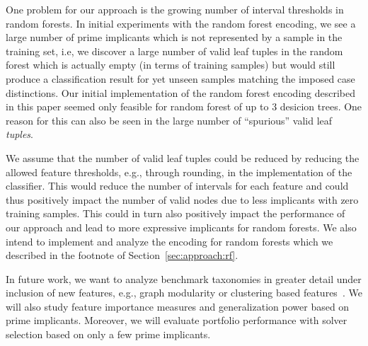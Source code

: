 \documentclass[a4paper, USenglish, cleveref, autoref, thm-restate]{lipics-v2021}
\theoremstyle{definition}
\begin{document}
One problem for our approach is the growing number of interval thresholds in random forests. 
In initial experiments with the random forest encoding, we see a large number of prime implicants which is not represented by a sample in the training set, i.e, we discover a large number of valid leaf tuples in the random forest which is actually empty (in terms of training samples) but would still produce a classification result for yet unseen samples matching the imposed case distinctions. 
Our initial implementation of the random forest encoding described in this paper seemed only feasible for random forest of up to 3 desicion trees. 
One reason for this can also be seen in the large number of ``spurious'' valid leaf \emph{tuples}. 

We assume that the number of valid leaf tuples could be reduced by reducing the allowed feature thresholds, e.g., through rounding, in the implementation of the classifier. 
This would reduce the number of intervals for each feature and could thus positively impact the number of valid nodes due to less implicants with zero training samples. 
This could in turn also positively impact the performance of our approach and lead to more expressive implicants for random forests. 
We also intend to implement and analyze the encoding for random forests which we described in the footnote of Section~\ref{sec:approach:rf}. 

In future work, we want to analyze benchmark taxonomies in greater detail under inclusion of new features, e.g., graph modularity or clustering based features~\cite{Ansotegui:2019:Community,Li:2021:Hierarchical}. 
We will also study feature importance measures and generalization power based on prime implicants. 
Moreover, we will evaluate portfolio performance with solver selection based on only a few prime implicants. 


\end{document}
